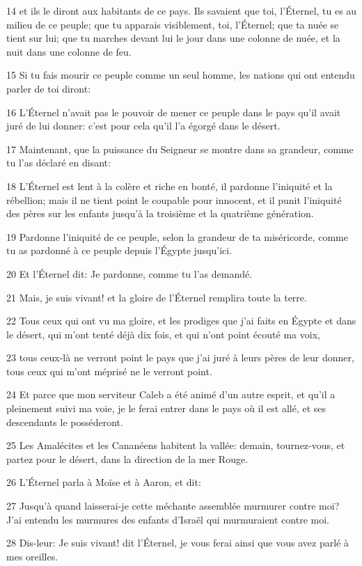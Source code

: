 \par 14 et ils le diront aux habitants de ce pays. Ils savaient que toi, l'Éternel, tu es au milieu de ce peuple; que tu apparais visiblement, toi, l'Éternel; que ta nuée se tient sur lui; que tu marches devant lui le jour dans une colonne de nuée, et la nuit dans une colonne de feu.
\par 15 Si tu fais mourir ce peuple comme un seul homme, les nations qui ont entendu parler de toi diront:
\par 16 L'Éternel n'avait pas le pouvoir de mener ce peuple dans le pays qu'il avait juré de lui donner: c'est pour cela qu'il l'a égorgé dans le désert.
\par 17 Maintenant, que la puissance du Seigneur se montre dans sa grandeur, comme tu l'as déclaré en disant:
\par 18 L'Éternel est lent à la colère et riche en bonté, il pardonne l'iniquité et la rébellion; mais il ne tient point le coupable pour innocent, et il punit l'iniquité des pères sur les enfants jusqu'à la troisième et la quatrième génération.
\par 19 Pardonne l'iniquité de ce peuple, selon la grandeur de ta miséricorde, comme tu as pardonné à ce peuple depuis l'Égypte jusqu'ici.
\par 20 Et l'Éternel dit: Je pardonne, comme tu l'as demandé.
\par 21 Mais, je suis vivant! et la gloire de l'Éternel remplira toute la terre.
\par 22 Tous ceux qui ont vu ma gloire, et les prodiges que j'ai faits en Égypte et dans le désert, qui m'ont tenté déjà dix fois, et qui n'ont point écouté ma voix,
\par 23 tous ceux-là ne verront point le pays que j'ai juré à leurs pères de leur donner, tous ceux qui m'ont méprisé ne le verront point.
\par 24 Et parce que mon serviteur Caleb a été animé d'un autre esprit, et qu'il a pleinement suivi ma voie, je le ferai entrer dans le pays où il est allé, et ses descendants le posséderont.
\par 25 Les Amalécites et les Cananéens habitent la vallée: demain, tournez-vous, et partez pour le désert, dans la direction de la mer Rouge.
\par 26 L'Éternel parla à Moïse et à Aaron, et dit:
\par 27 Jusqu'à quand laisserai-je cette méchante assemblée murmurer contre moi? J'ai entendu les murmures des enfants d'Israël qui murmuraient contre moi.
\par 28 Dis-leur: Je suis vivant! dit l'Éternel, je vous ferai ainsi que vous avez parlé à mes oreilles.
